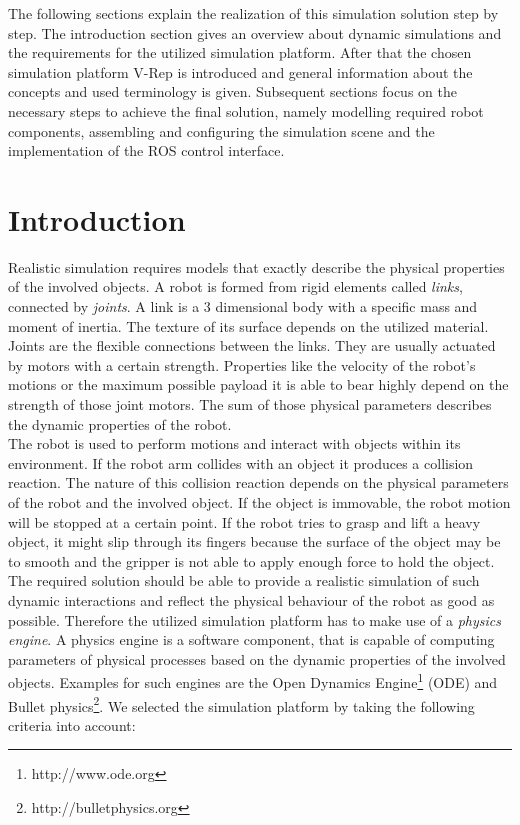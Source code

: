 The following sections explain the realization of this simulation solution step by step. The introduction section gives an overview about dynamic simulations and the requirements for the utilized simulation platform. After that the chosen simulation platform V-Rep is introduced and general information about the concepts and used terminology is given. Subsequent sections focus on the necessary steps to achieve the final solution, namely modelling required robot components, assembling and configuring the simulation scene and the implementation of the ROS control interface.

\section{Introduction}

Realistic simulation requires models that exactly describe the physical properties of the involved objects. A robot is formed from rigid elements called \emph{links}, connected by \emph{joints}. A link is a 3 dimensional body with a specific mass and moment of inertia. The texture of its surface depends on the utilized material. Joints are the flexible connections between the links. They are usually actuated by motors with a certain strength. Properties like the velocity of the robot's motions or the maximum possible payload it is able to bear highly depend on the strength of those joint motors. The sum of those physical parameters describes the dynamic properties of the robot. \\

The robot is used to perform motions and interact with objects within its environment. If the robot arm collides with an object it produces a collision reaction. The nature of this collision reaction depends on the physical parameters of the robot and the involved object. If the object is immovable, the robot motion will be stopped at a certain point. If the robot tries to grasp and lift a heavy object, it might slip through its fingers because the surface of the object may be to smooth and the gripper is not able to apply enough force to hold the object. \\

The required solution should be able to provide a realistic simulation of such dynamic interactions and reflect the physical behaviour of the robot as good as possible. Therefore the utilized simulation platform has to make use of a \emph{physics engine}. A physics engine is a software component, that is capable of computing parameters of physical processes based on the dynamic properties of the involved objects. Examples for such engines are the Open Dynamics Engine\footnote{http://www.ode.org} (ODE) and Bullet physics\footnote{http://bulletphysics.org}. We selected the simulation platform by taking the following criteria into account:

